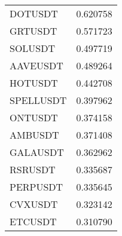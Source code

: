\documentclass[
  letterpaper,
  DIV=11,
  numbers=noendperiod]{scrartcl}
\begin{document}
\begin{longtable}[]{@{}ll@{}}
DOTUSDT & 0.620758 \\
GRTUSDT & 0.571723 \\
SOLUSDT & 0.497719 \\
AAVEUSDT & 0.489264 \\
HOTUSDT & 0.442708 \\
SPELLUSDT & 0.397962 \\
ONTUSDT & 0.374158 \\
AMBUSDT & 0.371408 \\
GALAUSDT & 0.362962 \\
RSRUSDT & 0.335687 \\
PERPUSDT & 0.335645 \\
CVXUSDT & 0.323142 \\
ETCUSDT & 0.310790 \\
\bottomrule()
\end{longtable}
\end{document}
